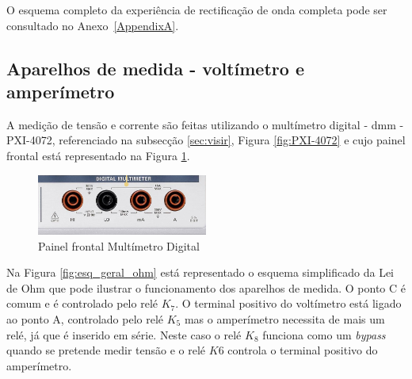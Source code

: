 O esquema completo da experiência de rectificação de onda completa pode ser consultado no Anexo~\ref{AppendixA}.




\subsection{Aparelhos de medida - voltímetro e amperímetro}
\label{sec:aparelhosmedida}

A medição de tensão e corrente são feitas utilizando o multímetro digital - \Acrfull{dmm} - PXI-4072, referenciado na subsecção \ref{sec:visir}, Figura \ref{fig:PXI-4072} e cujo painel frontal está representado na Figura \ref{fig:frontDMM}.

\begin{figure}[hbtp]
	\centering
	\includegraphics[width=0.5\textwidth]{figures/promenorDMM.png}
	\caption{Painel frontal Multímetro Digital}
	\label{fig:frontDMM}
\end{figure}

Na Figura \ref{fig:esq_geral_ohm} está representado o esquema simplificado da Lei de Ohm que pode ilustrar o funcionamento dos aparelhos de medida. O ponto C é comum e é controlado pelo relé $K_{7}$. O terminal positivo do voltímetro está ligado ao ponto A, controlado pelo relé $K_{5}$ mas o amperímetro necessita de mais um relé, já que é inserido em série. Neste caso o relé $K_{8}$ funciona como um \textit{bypass} quando se pretende medir tensão e o relé $K{6}$ controla o terminal positivo do amperímetro. 

